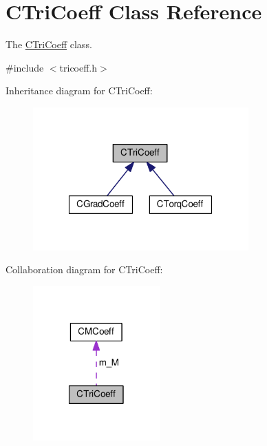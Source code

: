\hypertarget{classCTriCoeff}{\section{C\-Tri\-Coeff Class Reference}
\label{classCTriCoeff}
}


The \hyperlink{classCTriCoeff}{C\-Tri\-Coeff} class.  




{\ttfamily \#include $<$tricoeff.\-h$>$}



Inheritance diagram for C\-Tri\-Coeff\-:\nopagebreak
\begin{figure}[H]
\begin{center}
\leavevmode
\includegraphics[width=235pt]{classCTriCoeff__inherit__graph}
\end{center}
\end{figure}


Collaboration diagram for C\-Tri\-Coeff\-:\nopagebreak
\begin{figure}[H]
\begin{center}
\leavevmode
\includegraphics[width=138pt]{classCTriCoeff__coll__graph}
\end{center}
\end{figure}
